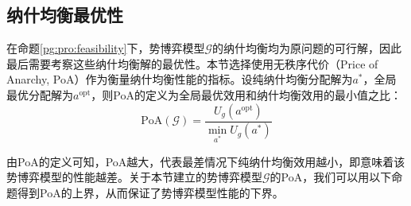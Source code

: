 \subsection{纳什均衡最优性}
\label{pg:mwlu:pgoptimal}

在命题\ref{pg:pro:feasibility}下，势博弈模型$\mathcal{G}$的纳什均衡均为原问题的可行解，因此最后需要考察这些纳什均衡解的最优性。本节选择使用无秩序代价（Price of Anarchy, PoA）作为衡量纳什均衡性能的指标。设纯纳什均衡分配解为$a^*$，全局最优分配解为$a^{\text{opt}}$，则PoA的定义为全局最优效用和纳什均衡效用的最小值之比：
\begin{equation}
\label{pg:eq:PoA}
	\mathrm{PoA}(\mathcal{G}) = \frac{U_g(a^{\text{opt}})}{\min_{a^*} U_g(a^*)}
\end{equation}

由PoA的定义可知，PoA越大，代表最差情况下纯纳什均衡效用越小，即意味着该势博弈模型的性能越差。关于本节建立的势博弈模型$\mathcal{G}$的PoA，我们可以用以下命题得到PoA的上界，从而保证了势博弈模型性能的下界。


